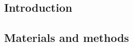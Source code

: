 



\subsection{Introduction}
\label{subsec:introduction_protrusion}

\subsection{Materials and methods}
\label{subsec:materials_protrusion}

